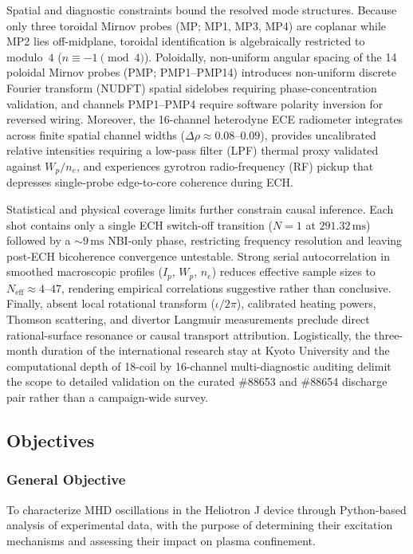 Spatial and diagnostic constraints bound the resolved mode structures. Because only three toroidal Mirnov probes (MP; MP1, MP3, MP4) are coplanar while MP2 lies off-midplane, toroidal identification is algebraically restricted to modulo~$4$ ($n \equiv -1 \pmod 4$). Poloidally, non-uniform angular spacing of the 14 poloidal Mirnov probes (PMP; PMP1--PMP14) introduces non-uniform discrete Fourier transform (NUDFT) spatial sidelobes requiring phase-concentration validation, and channels PMP1--PMP4 require software polarity inversion for reversed wiring. Moreover, the 16-channel heterodyne ECE radiometer integrates across finite spatial channel widths ($\Delta\rho \approx 0.08\text{--}0.09$), provides uncalibrated relative intensities requiring a low-pass filter (LPF) thermal proxy validated against $W_p/n_e$, and experiences gyrotron radio-frequency (RF) pickup that depresses single-probe edge-to-core coherence during ECH.

Statistical and physical coverage limits further constrain causal inference. Each shot contains only a single ECH switch-off transition ($N=1$ at $291.32\,\mathrm{ms}$) followed by a ${\sim}9\,\mathrm{ms}$ NBI-only phase, restricting frequency resolution and leaving post-ECH bicoherence convergence untestable. Strong serial autocorrelation in smoothed macroscopic profiles ($I_p$, $W_p$, $n_e$) reduces effective sample sizes to $N_{\mathrm{eff}} \approx 4\text{--}47$, rendering empirical correlations suggestive rather than conclusive. Finally, absent local rotational transform ($\iota/2\pi$), calibrated heating powers, Thomson scattering, and divertor Langmuir measurements preclude direct rational-surface resonance or causal transport attribution. Logistically, the three-month duration of the international research stay at Kyoto University and the computational depth of 18-coil by 16-channel multi-diagnostic auditing delimit the scope to detailed validation on the curated \#88653 and \#88654 discharge pair rather than a campaign-wide survey.

\subsection{Objectives}
\subsubsection{General Objective}
To characterize MHD oscillations in the Heliotron J device through Python-based analysis of experimental data, with the purpose of determining their excitation mechanisms and assessing their impact on plasma confinement.

